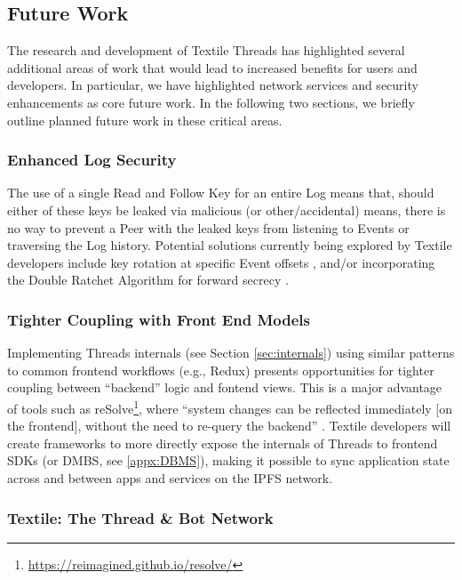 \documentclass{textile}
\begin{document}
\subsection{Future Work}

The research and development of Textile Threads has highlighted several additional areas of work that would lead to increased benefits for users and developers. In particular, we have highlighted network services and security enhancements as core future work. In the following two sections, we briefly outline planned future work in these critical areas.

\subsubsection{Enhanced Log Security}

The use of a single Read and Follow Key for an entire Log means that, should either of these keys be leaked via malicious (or other/accidental) means, there is no way to prevent a Peer with the leaked keys from listening to Events or traversing the Log history. Potential solutions currently being explored by Textile developers include key rotation at specific Event offsets \cite{hashicorpKeyRotation}, and/or incorporating the Double Ratchet Algorithm \cite{marlinspikeDoubleRatchetAlgorithm2016} for forward secrecy \cite{ungerSoKSecureMessaging2015}.

\subsubsection{Tighter Coupling with Front End Models}\label{sec:coupling}

Implementing Threads internals (see Section \ref{sec:internals}) using similar patterns to common frontend workflows (e.g., Redux) presents opportunities for tighter coupling between ``backend'' logic and fontend views. This is a major advantage of tools such as reSolve\footnote{\url{https://reimagined.github.io/resolve/}}, where ``system changes can be reflected immediately [on the frontend], without the need to re-query the backend'' \cite{ereminReduxInspiredBackend2019}. Textile developers will create frameworks to more directly expose the internals of Threads to frontend SDKs (or DMBS, see \ref{appx:DBMS}), making it possible to sync application state across and between apps and services on the IPFS network.

\subsubsection{Textile: The Thread \& Bot Network} \label{sec:Bots}
\end{document}

